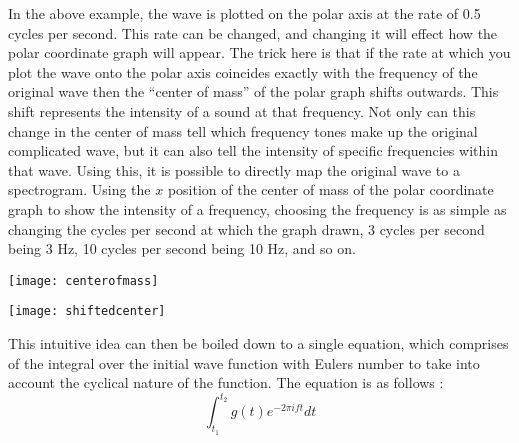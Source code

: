 In the above example, the wave is plotted on the polar axis at the rate of 0.5 cycles per second. This rate can be changed, and changing it will effect how the polar coordinate graph will appear. The trick here is that if the rate at which you plot the wave onto the polar axis coincides exactly with the frequency of the original wave then the ``center of mass'' of the polar graph shifts outwards. This shift represents the intensity of a sound at that frequency. Not only can this change in the center of mass tell which frequency tones make up the original complicated wave, but it can also tell the intensity of specific frequencies within that wave. Using this, it is possible to directly map the original wave to a spectrogram. Using the $x$ position of the center of mass of the polar coordinate graph to show the intensity of a frequency, choosing the frequency is as simple as changing the cycles per second at which the graph drawn, 3 cycles per second being 3 Hz, 10 cycles per second being 10 Hz, and so on.
\begin{center}
  \texttt{[image: centerofmass]} \\
\end{center}
\begin{center}
  \texttt{[image: shiftedcenter]} \\[12pt]
  \cite{bluebrown}
\end{center}
This intuitive idea can then be boiled down to a single equation, which comprises of the integral over the initial wave function with Euler\textquotesingle s number to take into account the cyclical nature of the function. The equation is as follows \cite{bluebrown}:
\begin{equation}
  \int_{t_1}^{t_2} g(t)e^{-2\pi i f t} dt
\end{equation} \\[\eqnspace]
